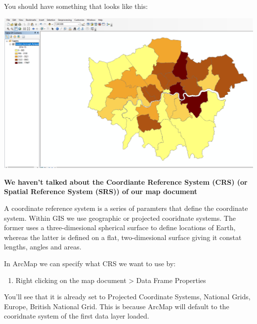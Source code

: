 \documentclass[]{book}
\providecommand{\tightlist}{%
  \setlength{\itemsep}{0pt}\setlength{\parskip}{0pt}}
\begin{document}
You should have something that looks like this:

\begin{center}\includegraphics[width=800pt]{prac1_images/thematicmap} \end{center}

\textbf{We haven't talked about the Coordiante Reference System (CRS) (or Spatial Reference System (SRS)) of our map document}

A coordinate reference system is a series of paramters that define the coordinate system. Within GIS we use geographic or projected cooridnate systems. The former uses a three-dimesional spherical surface to define locations of Earth, whereas the latter is defined on a flat, two-dimesional surface giving it constat lengths, angles and areas.

In ArcMap we can specify what CRS we want to use by:

\begin{enumerate}
\def\labelenumi{\arabic{enumi}.}
\setcounter{enumi}{19}
\tightlist
\item
  Right clicking on the map document \textgreater{} Data Frame Properties
\end{enumerate}

You'll see that it is already set to Projected Coordinate Systems, National Grids, Europe, British National Grid. This is because ArcMap will default to the cooridnate system of the first data layer loaded.
\end{document}
